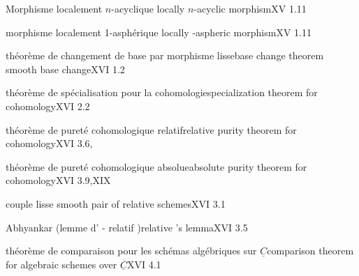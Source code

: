 
Morphisme  localement $n$-acyclique\quad {} locally $n$-acyclic morphism\quad XV 1.11

morphisme  localement 1-asphérique\quad {} locally -aspheric morphism\quad XV 1.11


théorème de changement de base par morphisme lisse\quad base change theorem   smooth base change\quad XVI 1.2

théorème de spécialisation pour la cohomologie\quad specialization theorem for cohomology\quad XVI 2.2

théorème de pureté cohomologique relatif\quad relative purity theorem for cohomology\quad XVI 3.6, 

théorème de pureté cohomologique absolue\quad absolute purity theorem for cohomology\quad XVI 3.9,XIX 

couple lisse \quad smooth pair of relative schemes\quad XVI 3.1

 Abhyankar (lemme d' - relatif )\quad relative 's lemma\quad XVI 3.5

théorème de comparaison pour les schémas algébriques sur $\underline{C}$\quad comparison theorem for algebraic schemes over $\underline{C}$\quad XVI 4.1
